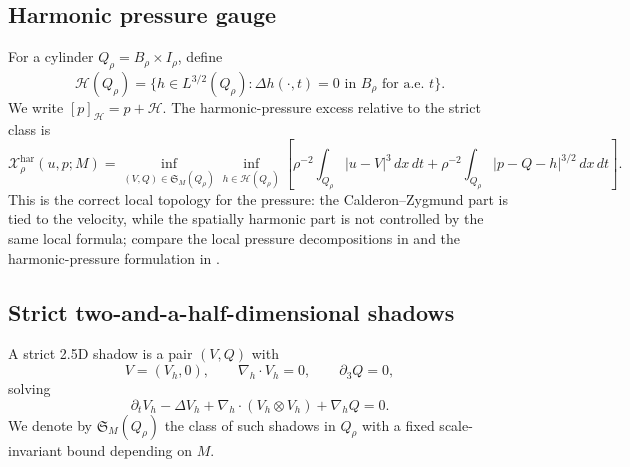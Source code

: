 \documentclass[11pt]{article}
\numberwithin{equation}{section}
\newcommand{\har}{\mathrm{har}}
\newcommand{\dxdt}{\,dx\,dt}
\newcommand{\nabh}{\nabla_h}
\newcommand{\divh}{\nabla_h\cdot}
\newcommand{\calH}{\mathcal H}
\newcommand{\calX}{\mathcal X}
\newcommand{\frakS}{\mathfrak S}
\begin{document}
\subsection{Harmonic pressure gauge}

For a cylinder \(Q_\rho=B_\rho\times I_\rho\), define
\[
\calH(Q_\rho)=\{h\in L^{3/2}(Q_\rho):\Delta h(\cdot,t)=0\text{ in }B_\rho\text{ for a.e. }t\}.
\]
We write \([p]_{\calH}=p+\calH\).  The harmonic-pressure excess relative to the strict class is
\begin{equation}\label{eq:harmonic-excess}
\calX^{\har}_\rho(u,p;M)=
\inf_{(V,Q)\in\frakS_M(Q_\rho)}\inf_{h\in\calH(Q_\rho)}
\left[
\rho^{-2}\int_{Q_\rho}|u-V|^3\dxdt
+
\rho^{-2}\int_{Q_\rho}|p-Q-h|^{3/2}\dxdt
\right].
\end{equation}
This is the correct local topology for the pressure: the Calderon--Zygmund part is tied to the velocity, while the spatially harmonic part is not controlled by the same local formula; compare the local pressure decompositions in \cite{SohrWahl1986,Wolf2017,Seregin2015} and the harmonic-pressure formulation in \cite{Yu2026HarmonicPressure}.

\subsection{Strict two-and-a-half-dimensional shadows}

A strict 2.5D shadow is a pair \((V,Q)\) with
\[
V=(V_h,0),
\qquad \divh V_h=0,
\qquad \partial_3Q=0,
\]
solving
\begin{equation}\label{eq:strict-system}
\partial_tV_h-\Delta V_h+\nabh\cdot(V_h\otimes V_h)+\nabh Q=0.
\end{equation}
We denote by \(\frakS_M(Q_\rho)\) the class of such shadows in \(Q_\rho\) with a fixed scale-invariant bound depending on \(M\).
\end{document}
